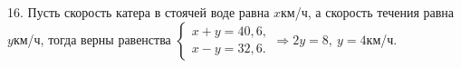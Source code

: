16. Пусть скорость катера в стоячей воде равна $x$км/ч, а скорость течения равна $y$км/ч, тогда верны равенства $\begin{cases} x+y=40,6,\\ x-y=32,6.\end{cases}
\Rightarrow 2y=8,\ y=4$км/ч.\\
